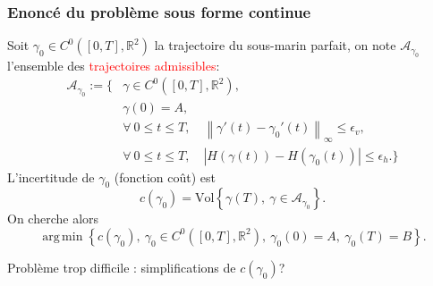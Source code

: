 \documentclass[11pt]{beamer}
\newcommand{\R}{\mathbb{R}}
\DeclareMathOperator*{\argmin}{arg\,min}
\begin{document}
\begin{frame}

\frametitle{Enoncé du problème sous forme continue}

Soit $\gamma_0 \in C^0( [0,T], \R^2)$ la trajectoire du sous-marin parfait, on note $\mathcal{A}_{\gamma_0}$ l'ensemble des \textcolor{red}{trajectoires admissibles}:
\[
	\begin{array}{ll}
		\mathcal{A}_{\gamma_0} :=   \Big\{ &\gamma \in C^0( [0,T], \R^2), \\
			& \gamma(0) = A, \\
			& \forall \ 0 \le t \le T, \quad \left\|  \gamma'(t)  - \gamma_0'(t) \right\|_{\infty} \le \epsilon_v, \\
			& \forall \ 0 \le t \le T, \quad \left| H(\gamma(t))  - H(\gamma_0(t)) \right| \le \epsilon_h. \Big\}
			\end{array}
\]
L'incertitude de $\gamma_0$ (fonction coût) est
\[
	c(\gamma_0) = \text{Vol} \left\{ \gamma(T), \ \gamma \in \mathcal{A}_{\gamma_0} \right\}.
\]
On cherche alors
\[
	\argmin \left\{ c(\gamma_0), \ \gamma_0 \in C^0( [0,T], \R^2), \ \gamma_0(0) = A, \ \gamma_0(T) = B \right\}.
\]

Problème trop difficile : simplifications de $c(\gamma_{0})$?

\end{frame}






\end{document}
